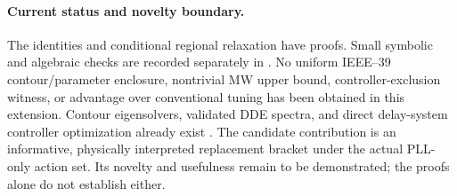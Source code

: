 \paragraph{Current status and novelty boundary.}
The identities and conditional regional relaxation have proofs.
Small symbolic and algebraic checks are recorded separately in
.
No uniform IEEE--39 contour/parameter enclosure, nontrivial MW upper
bound, controller-exclusion witness, or advantage over conventional
tuning has been obtained in this extension.
Contour eigensolvers, validated DDE spectra, and direct delay-system
controller optimization already exist \cite{beyn,lessard,michielsdesign}.
The candidate contribution is an informative, physically interpreted
replacement bracket under the actual PLL-only action set. Its novelty
and usefulness remain to be demonstrated; the proofs alone do not
establish either.
